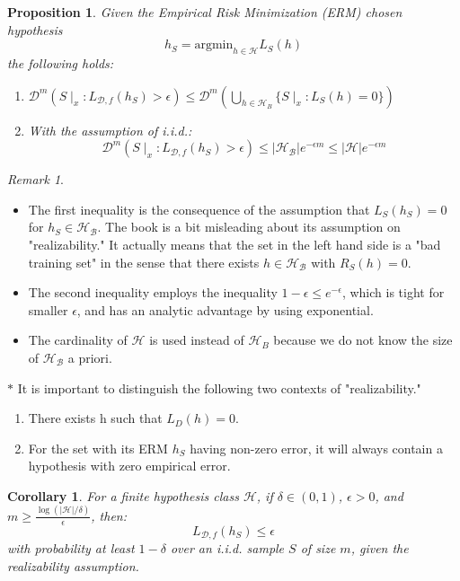 \documentclass[11pt,reqno]{amsart}
\newtheorem{proposition}[theorem]{Proposition}
\newtheorem{corollary}[theorem]{Corollary}
\theoremstyle{remark}
\newtheorem{remark}[example]{Remark}
\begin{document}
\begin{proposition}
Given the Empirical Risk Minimization (ERM) chosen hypothesis 
\[h_S = \text{argmin}_{h\in\mathcal{H}}L_{S}(h)
\] the following holds:
\begin{enumerate}
\item $\mathcal{D}^m\left(S\mid_x:L_{\mathcal{D}, f}(h_S)>\epsilon\right) \leq \mathcal{D}^m\left(\bigcup_{h\in \mathcal{H}_B}\{S\mid_x:L_S(h)=0\}\right)$

\item With the assumption of i.i.d.:
\[\mathcal{D}^m\left(S\mid_x:L_{\mathcal{D}, f}(h_S)>\epsilon\right) \leq \lvert \mathcal{H_B}\rvert e^{-\epsilon m} \leq \lvert \mathcal{H}\rvert e^{-\epsilon m}\]
\end{enumerate}
\end{proposition}

\begin{remark}
\begin{itemize}
\item The first inequality is the consequence of the assumption that $L_S(h_S)=0$ for $h_S\in \mathcal{H}_\mathcal{B}$. The book is a bit misleading about its assumption on "realizability." It actually means that the set in the left hand side is a "bad training set" in the sense that there exists $h\in \mathcal{H}_\mathcal{B}$ with $R_S(h)=0$.
\item The second inequality employs the inequality $1-\epsilon \leq e^{-\epsilon}$, which is tight for smaller $\epsilon$, and has an analytic advantage by using exponential.
\item The cardinality of $\mathcal{H}$ is used instead of $\mathcal{H}_B$ because we do not know the size of $\mathcal{H_B}$ a priori.
\end{itemize}
\end{remark}

$\ast$ It is important to distinguish the following two contexts of "realizability."
\begin{enumerate}
\item There exists h such that $L_D(h)=0$.
\item For the set with its ERM $h_S$ having non-zero error, it will always contain a hypothesis with zero empirical error.
\end{enumerate}

\begin{corollary}
For a finite hypothesis class $\mathcal{H}$, if $\delta\in (0,1)$, $\epsilon > 0$, and $m \geq \frac{\log(\lvert\mathcal{H}\rvert/\delta)}{\epsilon}$, then:
\[L_{\mathcal{D}, f}(h_S) \leq \epsilon\]
with probability at least $1-\delta$ over an i.i.d. sample $S$ of size $m$, given the realizability assumption.
\end{corollary}
\end{document}
